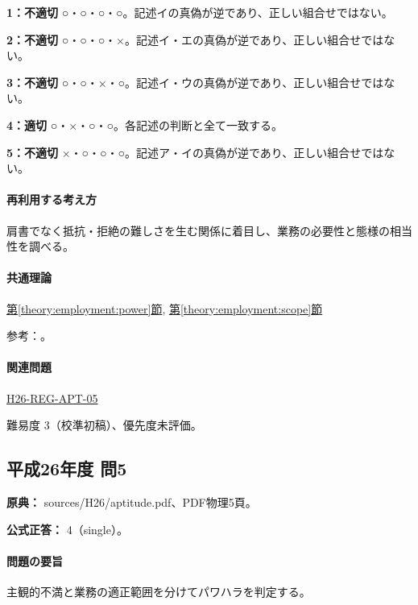 \noindent\textbf{1：不適切} ○・○・○・○。記述イの真偽が逆であり、正しい組合せではない。\par

\noindent\textbf{2：不適切} ○・○・○・×。記述イ・エの真偽が逆であり、正しい組合せではない。\par

\noindent\textbf{3：不適切} ○・○・×・○。記述イ・ウの真偽が逆であり、正しい組合せではない。\par

\noindent\textbf{4：適切} ○・×・○・○。各記述の判断と全て一致する。\par

\noindent\textbf{5：不適切} ×・○・○・○。記述ア・イの真偽が逆であり、正しい組合せではない。\par

\paragraph{再利用する考え方} 肩書でなく抵抗・拒絶の難しさを生む関係に着目し、業務の必要性と態様の相当性を調べる。

\paragraph{共通理論} \hyperref[theory:employment:power]{第\ref*{theory:employment:power}節}, \hyperref[theory:employment:scope]{第\ref*{theory:employment:scope}節}

\par 参考：\cite{employment_power2012,employment_power_current}。

\paragraph{関連問題} \hyperref[q:h26-reg-apt-05]{H26-REG-APT-05}

\par 難易度 3（校準初稿）、優先度未評価。

\subsection{平成26年度 問5}
\label{q:h26-reg-apt-05}

\noindent\textbf{原典：} sources/H26/aptitude.pdf、PDF物理5頁。

\textbf{公式正答：} 4（single）。

\paragraph{問題の要旨} 主観的不満と業務の適正範囲を分けてパワハラを判定する。

